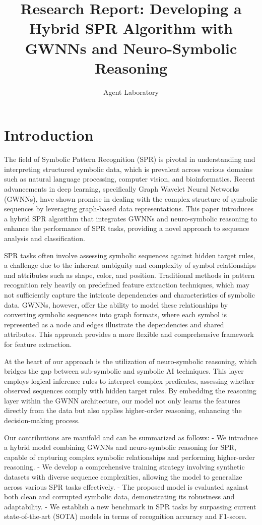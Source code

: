 \documentclass{article}
\title{Research Report: Developing a Hybrid SPR Algorithm with GWNNs and Neuro-Symbolic Reasoning}
\author{Agent Laboratory}
\date{}
\begin{document}
\maketitle

\begin{abstract}

\end{abstract}

\section{Introduction}
The field of Symbolic Pattern Recognition (SPR) is pivotal in understanding and interpreting structured symbolic data, which is prevalent across various domains such as natural language processing, computer vision, and bioinformatics. Recent advancements in deep learning, specifically Graph Wavelet Neural Networks (GWNNs), have shown promise in dealing with the complex structure of symbolic sequences by leveraging graph-based data representations. This paper introduces a hybrid SPR algorithm that integrates GWNNs and neuro-symbolic reasoning to enhance the performance of SPR tasks, providing a novel approach to sequence analysis and classification.

SPR tasks often involve assessing symbolic sequences against hidden target rules, a challenge due to the inherent ambiguity and complexity of symbol relationships and attributes such as shape, color, and position. Traditional methods in pattern recognition rely heavily on predefined feature extraction techniques, which may not sufficiently capture the intricate dependencies and characteristics of symbolic data. GWNNs, however, offer the ability to model these relationships by converting symbolic sequences into graph formats, where each symbol is represented as a node and edges illustrate the dependencies and shared attributes. This approach provides a more flexible and comprehensive framework for feature extraction.

At the heart of our approach is the utilization of neuro-symbolic reasoning, which bridges the gap between sub-symbolic and symbolic AI techniques. This layer employs logical inference rules to interpret complex predicates, assessing whether observed sequences comply with hidden target rules. By embedding the reasoning layer within the GWNN architecture, our model not only learns the features directly from the data but also applies higher-order reasoning, enhancing the decision-making process.

Our contributions are manifold and can be summarized as follows:
- We introduce a hybrid model combining GWNNs and neuro-symbolic reasoning for SPR, capable of capturing complex symbolic relationships and performing higher-order reasoning.
- We develop a comprehensive training strategy involving synthetic datasets with diverse sequence complexities, allowing the model to generalize across various SPR tasks effectively.
- The proposed model is evaluated against both clean and corrupted symbolic data, demonstrating its robustness and adaptability.
- We establish a new benchmark in SPR tasks by surpassing current state-of-the-art (SOTA) models in terms of recognition accuracy and F1-score.
\end{document}

